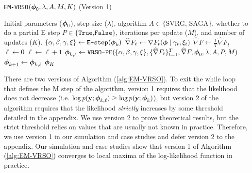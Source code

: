 \begin{algorithm}
\caption{\texttt{EM-VRSO}$(\boldsymbol{\phi}_0,\lambda, A, M, K)$ (Version 1)}\label{alg:EM-VRSO}
\begin{algorithmic}[1]
\Require Initial parameters ($\boldsymbol{\phi}_{0}$), step size ($\lambda$), algorithm $A \in \{\text{SVRG, SAGA}\}$, whether to do a partial E step $P \in \{\texttt{True,False}\}$, iterations per update ($M$), and number of updates ($K$).
%
\vspace{5pt}
\vspace{5pt}
% 
\State $\{\alpha,\beta,\gamma,\xi\} \gets \texttt{E-step}(\boldsymbol{\phi}_{k})$ 
%
\vspace{5pt}
%
 
    \State $\widehat \nabla F_t \gets \nabla F_t(\boldsymbol{\phi} \mid \gamma_t, \xi_t)$ 
\EndFor
\State $\widehat \nabla F \gets \frac{1}{T} \widehat \nabla F_t$
%
\vspace{5pt}
%
\State $\ell \gets 0$ 
%
%
\State $\ell \gets \ell+1$
\State $\boldsymbol{\phi}_{k,\ell} \gets \texttt{VRSO-PE}(\{\alpha,\beta,\gamma,\xi\},\{\widehat \nabla F_t\}_{t=1}^T, \widehat \nabla F,\boldsymbol{\phi}_0,\lambda,A,P,M)$
%
\EndWhile
\State $\boldsymbol{\phi}_{k+1} \gets \boldsymbol{\phi}_{k,\ell}$
\EndFor
\State \Return $\boldsymbol{\phi}_K$
\end{algorithmic}
\end{algorithm}

There are two versions of Algorithm (\ref{alg:EM-VRSO}). To exit the while loop that defines the M step of the algorithm, version 1 requires that the likelihood does not decrease (i.e. $\log p(\mathbf{y};\boldsymbol{\phi}_{k,\ell}) \geq \log p(\mathbf{y};\boldsymbol{\phi}_{k})$), but version 2 of the algorithm requires that the likelihood \textit{strictly} increases by some threshold detailed in the appendix. We use version 2 to prove theoretical results, but the strict threshold relies on values that are usually not known in practice. Therefore, we use version 1 in our simulation and case studies and defer version 2 to the appendix. Our simulation and case studies show that version 1 of Algorithm (\ref{alg:EM-VRSO}) converges to local maxima of the log-likelihood function in practice. 


